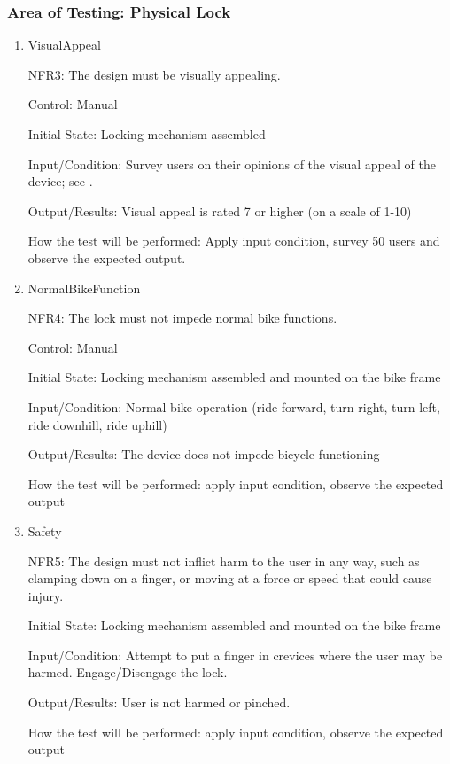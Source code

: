 \documentclass[12pt, titlepage]{article}
\begin{document}
\subsubsection{Area of Testing: Physical Lock}
\begin{enumerate}

\item{VisualAppeal

NFR3: The design must be visually appealing. }

Control: Manual 

Initial State: Locking mechanism assembled 

Input/Condition: Survey users on their opinions of the visual appeal of the device; see .

Output/Results: Visual appeal is rated 7 or higher (on a scale of 1-10) 

How the test will be performed: Apply input condition, survey 50 users and observe the expected output.

\item{NormalBikeFunction

NFR4: The lock must not impede normal bike functions. }

Control: Manual 

Initial State: Locking mechanism assembled and mounted on the bike frame 

Input/Condition: Normal bike operation (ride forward, turn right, turn left, ride downhill, ride uphill) 

Output/Results: The device does not impede bicycle functioning 

How the test will be performed: apply input condition, observe the expected output

\item{Safety

NFR5: The design must not inflict harm to the user in any way, such as clamping down on a finger, or moving at a force or speed that could cause injury. }

Initial State: Locking mechanism assembled and mounted on the bike frame 

Input/Condition: Attempt to put a finger in crevices where the user may be harmed. Engage/Disengage the lock.

Output/Results: User is not harmed or pinched. 

How the test will be performed: apply input condition, observe the expected output

\end{enumerate}
\end{document}
